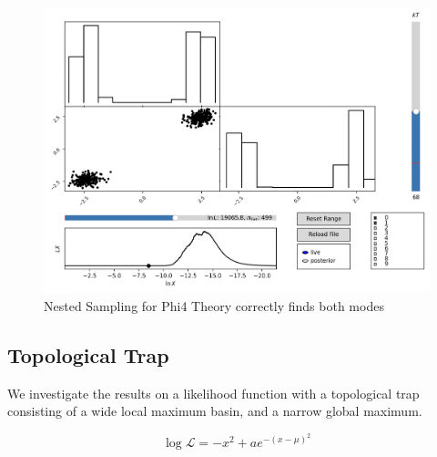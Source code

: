 \documentclass[11pt]{article}
\begin{document}
    \begin{figure}[H]
        \centering
        \includegraphics[width=0.75\linewidth]{../figures/phi4_anesthetic}
        \caption{Nested Sampling for Phi4 Theory correctly finds both modes}
        \label{fig:phi4anesthetic}
    \end{figure}

    \subsection{Topological Trap}
    We investigate the results on a likelihood function with a topological trap
    consisting of a wide local maximum basin, and a narrow global maximum.

    \[
        \log \mathcal{L} = -x^2 + a e^{-(x-\mu)^2}
    \]
\end{document}
